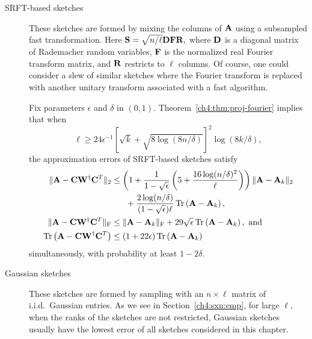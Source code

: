 \begin{description}
 \item[SRFT-based sketches] These sketches are formed by mixing the columns of $\mathbf{A}$ using a
 subsampled fast transformation. Here $\mathbf{S} = \sqrt{n/\ell} \mathbf{D} \mathbf{F} \mathbf{R},$ where $\mathbf{D}$
 is a diagonal matrix of Rademacher random variables, $\mathbf{F}$ is the normalized real Fourier transform
 matrix, and $\mathbf{R}$ restricts to $\ell$ columns. Of course, one could consider a slew of similar
 sketches where the Fourier transform is replaced with another unitary transform associated
 with a fast algorithm.
 
 Fix parameters $\epsilon$ and $\delta$ in $(0,1).$ Theorem~\ref{ch4:thm:proj-fourier} implies that when 
 \[
\ell \geq 24\epsilon^{-1}[\sqrt{k} + \sqrt{8\log(8n/\delta)}]^2 \log(8k/\delta),  
 \]
 the approximation errors of SRFT-based sketches satisfy
 \begin{align*}
  \|\mathbf{A} - \mathbf{C}\mathbf{W}^\dagger \mathbf{C}^T\|_2 & \leq 
   \left(1 + \frac{1}{1 - \sqrt{\epsilon}} 
   \left(5 + \frac{16 \log(n/\delta)^2}{\ell}\right)\right) \|\mathbf{A} - \mathbf{A}_k\|_2 \\
   &\hspace{6mm} + \frac{2 \log(n/\delta)}{(1-\sqrt{\epsilon})\ell}\operatorname{Tr}\left(\mathbf{A} - \mathbf{A}_k\right) , \\ 
   \|\mathbf{A} - \mathbf{C}\mathbf{W}^\dagger \mathbf{C}^T\|_{\mathrm{F}} & \leq
   \|\mathbf{A} - \mathbf{A}_k\|_{\mathrm{F}} +  29 \sqrt{\epsilon} \operatorname{Tr}\left(\mathbf{A} - \mathbf{A}_k\right), \text{ and} \\
  \operatorname{Tr}\left(\mathbf{A} - \mathbf{C}\mathbf{W}^\dagger \mathbf{C}^T\right) & \leq (1 + 22\epsilon)\operatorname{Tr}\left(\mathbf{A} - \mathbf{A}_k\right)
 \end{align*}
 simultaneously, with probability at least $1-2\delta.$
 
 
 \item[Gaussian sketches] These sketches are formed by sampling with an $n \times \ell$ matrix of i.i.d.\ 
 Gaussian entries. As we see in Section~\ref{ch4:sxn:emp}, for large $\ell,$ when the ranks of the sketches are not restricted,
 Gaussian sketches usually have the lowest error of all sketches considered in this chapter.
 

\end{description}
